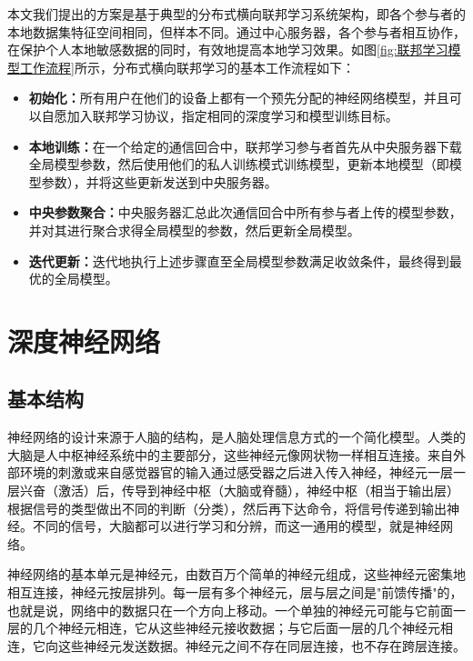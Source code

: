 本文我们提出的方案是基于典型的分布式横向联邦学习系统架构，即各个参与者的本地数据集特征空间相同，但样本不同。通过中心服务器，各个参与者相互协作，在保护个人本地敏感数据的同时，有效地提高本地学习效果。如图\ref{fig:联邦学习模型工作流程}所示，分布式横向联邦学习的基本工作流程如下：
\begin{itemize}
\item \textbf{初始化：}所有用户在他们的设备上都有一个预先分配的神经网络模型，并且可以自愿加入联邦学习协议，指定相同的深度学习和模型训练目标。
\item  \textbf{本地训练：}在一个给定的通信回合中，联邦学习参与者首先从中央服务器下载全局模型参数，然后使用他们的私人训练模式训练模型，更新本地模型（即模型参数），并将这些更新发送到中央服务器。
\item \textbf{中央参数聚合：}中央服务器汇总此次通信回合中所有参与者上传的模型参数，并对其进行聚合求得全局模型的参数，然后更新全局模型。
\item \textbf{迭代更新：}迭代地执行上述步骤直至全局模型参数满足收敛条件，最终得到最优的全局模型。
\end{itemize}{}

\section{深度神经网络}
\subsection{基本结构}
神经网络的设计来源于人脑的结构，是人脑处理信息方式的一个简化模型。人类的大脑是人中枢神经系统中的主要部分，这些神经元像网状物一样相互连接。来自外部环境的刺激或来自感觉器官的输入通过感受器之后进入传入神经，神经元一层一层兴奋（激活）后，传导到神经中枢（大脑或脊髓），神经中枢（相当于输出层）根据信号的类型做出不同的判断（分类），然后再下达命令，将信号传递到输出神经。不同的信号，大脑都可以进行学习和分辨，而这一通用的模型，就是神经网络。

神经网络的基本单元是神经元，由数百万个简单的神经元组成，这些神经元密集地相互连接，神经元按层排列。每一层有多个神经元，层与层之间是"前馈传播"的，也就是说，网络中的数据只在一个方向上移动。一个单独的神经元可能与它前面一层的几个神经元相连，它从这些神经元接收数据；与它后面一层的几个神经元相连，它向这些神经元发送数据。神经元之间不存在同层连接，也不存在跨层连接。

